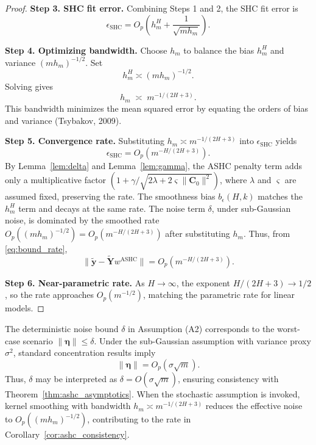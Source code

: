 \documentclass{article}
\begin{document}
\begin{proof}
\textbf{Step 3. SHC fit error.}
Combining Steps 1 and 2, the SHC fit error is
\[
\epsilon_{\text{SHC}}
= O_p\!\left(h_m^H + \frac{1}{\sqrt{m h_m}}\right).
\]

\textbf{Step 4. Optimizing bandwidth.}
Choose $h_m$ to balance the bias $h_m^H$ and variance $(m h_m)^{-1/2}$. Set
\[
h_m^H \asymp (m h_m)^{-1/2}.
\]
Solving gives
\[
h_m \;\asymp\; m^{-1/(2H+3)}.
\]
This bandwidth minimizes the mean squared error by equating the orders of bias and variance (Tsybakov, 2009).

\textbf{Step 5. Convergence rate.}
Substituting $h_m \asymp m^{-1/(2H+3)}$ into $\epsilon_{\text{SHC}}$ yields
\[
\epsilon_{\text{SHC}}
= O_p\!\left(m^{-H/(2H+3)}\right).
\]
By Lemma~\ref{lem:delta} and Lemma~\ref{lem:gamma}, the ASHC penalty term adds only a multiplicative factor $(1+\gamma/\sqrt{2\lambda + 2\varsigma \|\mathbf{C}_0\|^2})$, where $\lambda$ and $\varsigma$ are assumed fixed, preserving the rate. The smoothness bias $b_\epsilon(H,k)$ matches the $h_m^H$ term and decays at the same rate. The noise term $\delta$, under sub-Gaussian noise, is dominated by the smoothed rate $O_p((m h_m)^{-1/2}) = O_p(m^{-H/(2H+3)})$ after substituting $h_m$. Thus, from \eqref{eq:bound_rate},
\[
\|\widetilde{\mathbf{y}} - \widetilde{\mathbf{Y}} w^{\text{ASHC}}\|
= O_p\!\left(m^{-H/(2H+3)}\right).
\]

\textbf{Step 6. Near-parametric rate.}
As $H \to \infty$, the exponent $H/(2H+3) \to 1/2$, so the rate approaches $O_p(m^{-1/2})$, matching the parametric rate for linear models.
\end{proof}

\begin{remark}
\label{rem:delta}
The deterministic noise bound $\delta$ in Assumption (A2) corresponds to the worst-case scenario $\|\bm{\eta}\| \leq \delta$. Under the sub-Gaussian assumption with variance proxy $\sigma^2$, standard concentration results imply
\[
\|\bm{\eta}\| = O_p(\sigma \sqrt{m}).
\]
Thus, $\delta$ may be interpreted as $\delta = O(\sigma \sqrt{m})$, ensuring consistency with Theorem~\ref{thm:ashc_asymptotics}. When the stochastic assumption is invoked, kernel smoothing with bandwidth $h_m \asymp m^{-1/(2H+3)}$ reduces the effective noise to $O_p((m h_m)^{-1/2})$, contributing to the rate in Corollary~\ref{cor:ashc_consistency}.
\end{remark}
\end{document}
